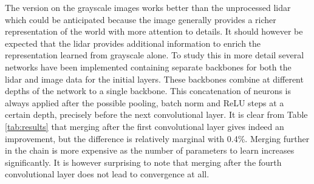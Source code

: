The version on the grayscale images works better than the unprocessed lidar which could be anticipated because the image generally provides a richer representation of the world with more attention to details. It should however be expected that the lidar provides additional information to enrich the representation learned from grayscale alone. To study this in more detail several networks have been implemented containing separate backbones for both the lidar and image data for the initial layers. These backbones combine at different depths of the network to a single backbone. This concatenation of neurons is always applied after the possible pooling, batch norm and ReLU steps at a certain depth, precisely before the next convolutional layer.
It is clear from Table \ref{tab:results} that merging after the first convolutional layer gives indeed an improvement, but the difference is relatively marginal with 0.4\%. Merging further in the chain is more expensive as the number of parameters to learn increases significantly. It is however surprising to note that merging after the fourth convolutional layer does not lead to convergence at all.

